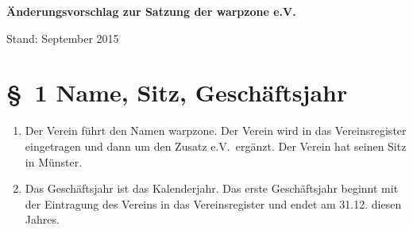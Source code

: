 \documentclass[11pt,DIV12]{scrartcl}
\begin{document}
\begin{center}
\Huge
\textbf{Änderungsvorschlag zur Satzung der warpzone e.V.}

\vspace{4mm}
\noindent
\Large
Stand: September 2015
\end{center}

\vspace{2mm}
\normalsize
\section*{§~1 Name, Sitz, Geschäftsjahr}
\begin{enumerate}
\item Der Verein führt den Namen \glqq warpzone\grqq . Der Verein wird in das Vereinsregister eingetragen und dann um den Zusatz \glqq e.V.\grqq\ ergänzt. Der Verein hat seinen Sitz in Münster.
\item Das Geschäftsjahr ist das Kalenderjahr. Das erste Geschäftsjahr beginnt mit der Eintragung des Vereins in das Vereinsregister und endet am 31.12. diesen Jahres.
\end{enumerate}
\end{document}
